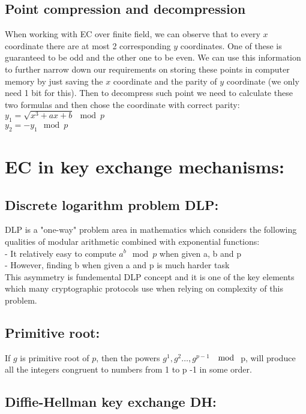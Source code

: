 \documentclass[bp,en]{FEIstyle}
\begin{document}
\subsection*{Point compression and decompression}
When working with EC over finite field, we can observe that to every $x$ coordinate there are at most 2 corresponding $y$ coordinates. One of these is guaranteed to be odd and the other one to be even. We can use this information to further narrow down our requirements on storing these points in computer memory by just saving the $x$ coordinate and the parity of $y$ coordinate (we only need 1 bit for this). Then to decompress such point we need to calculate these two formulas and then chose the coordinate with correct parity: \\
    $y_1 = \sqrt{x^3 + ax + b} \mod p$\\ $y_2 = - y_1 \mod p$
\newpage

\section*{EC in key exchange mechanisms:}

\subsection*{Discrete logarithm problem DLP:}

DLP is a "one-way" problem area in mathematics which considers the following qualities of modular arithmetic combined with exponential functions:\\
- It relatively easy to compute $a^b \mod{p}$ when given a, b and p\\
- However, finding b when given a and p is much harder task\\ 
This asymmetry is fundemental DLP concept and it is one of the key 
elements which many cryptographic protocols use when relying on complexity of this problem.


\subsection*{Primitive root:}
If $g$ is primitive root of $p$, then the powers $g^1,g^2…,g^{p - 1}$ $\mod$ p, will produce all the integers congruent to numbers from 1 to p -1 in some order.


\subsection*{Diffie-Hellman key exchange DH:}
\end{document}
